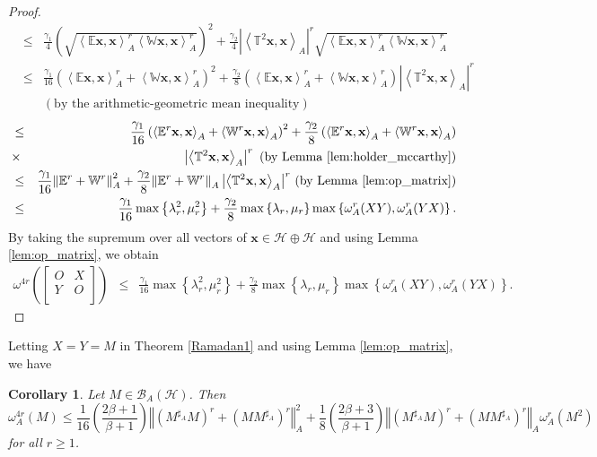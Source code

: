 \documentclass{article}
\newcommand{\bra}[1]{\left(#1\right)}
\newcommand{\seqA}[1]{{\left<#1\right>}_{A}}
\newcommand{\normA}[1]{{\left\Vert#1\right\Vert}_{A}}
\newcommand{\abs}[1]{\left\vert#1\right\vert}
\newcommand{\set}[1]{\left\{#1\right\}}
\newcommand{\hh}{\mathcal{H}\oplus\mathcal{H}}
\newcommand {\W}{\mathbb{W}}
\newcommand {\E}{\mathbb{E}}
\newcommand {\Ma}{M^{\sharp_{A}}}
\newcommand {\T}{\mathbb{T}}
\newcommand {\h}{\mathcal{H}}
\renewcommand {\b}{\mathcal{B}}
\newtheorem{corollary}[theorem]{Corollary}
\begin{document}
\begin{proof}
\begin{eqnarray*}
  &\leq& \frac{\gamma_1}{4}\bra{\sqrt{\seqA{\E\mathbf{x},\mathbf{x}}^{r}\seqA{\W\mathbf{x},\mathbf{x}}^{r}}}^2+
  \frac{\gamma_2}{4}\abs{\seqA{\T^2\mathbf{x},\mathbf{x}}}^r\sqrt{\seqA{\E\mathbf{x},\mathbf{x}}^{r}\seqA{\W\mathbf{x},\mathbf{x}}^{r}}\\
  &\leq& \frac{\gamma_1}{16}\bra{\seqA{\E\mathbf{x},\mathbf{x}}^{r}+\seqA{\W\mathbf{x},\mathbf{x}}^{r}}^2+
  \frac{\gamma_2}{8}\bra{\seqA{\E\mathbf{x},\mathbf{x}}^{r}+\seqA{\W\mathbf{x},\mathbf{x}}^{r}}\abs{\seqA{\T^2\mathbf{x},\mathbf{x}}}^r\\
  &&\bra{\mbox{by the arithmetic-geometric mean inequality}}
  \end{eqnarray*}
   \begin{eqnarray*}
  &\leq& \frac{\gamma_1}{16}\bra{\seqA{\E^r\mathbf{x},\mathbf{x}}
  +\seqA{\W^r\mathbf{x},\mathbf{x}}}^2+\frac{\gamma_2}{8}\bra{\seqA{\E^r\mathbf{x},\mathbf{x}}+
  \seqA{\W^r\mathbf{x},\mathbf{x}}}\\
  &\times&\abs{\seqA{\T^2\mathbf{x},\mathbf{x}}}^r\,\,\bra{\mbox{by Lemma \ref{lem:holder_mccarthy}}}\\
   &\leq& \frac{\gamma_1}{16}\normA{\E^r+\W^r}^2+\frac{\gamma_2}{8}\normA{\E^r+\W^r}\abs{\seqA{\T^2\mathbf{x},\mathbf{x}}}^{r}\,\bra{\mbox{by Lemma \ref{lem:op_matrix}}}\\
   &\leq&\frac{\gamma_1}{16}\max\set{\lambda_r^2,\mu_r^2}+\frac{\gamma_2}{8}\max\set{\lambda_r,\mu_r}\max\set{\omega_A^r(XY),\omega_A^r(YX)}.
   \end{eqnarray*}
By taking the supremum over all vectors of $\mathbf{x}\in\hh$ and using Lemma \ref{lem:op_matrix}, we obtain
\begin{eqnarray*}
  \omega^{4r}\bra{\begin{bmatrix} O& X\\ Y& O \\\end{bmatrix}}&\leq& \frac{\gamma_1}{16}\max\set{\lambda_r^2,\mu_r^2}+\frac{\gamma_2}{8}\max\set{\lambda_r,\mu_r}\max\set{\omega_A^r(XY),\omega_A^r(YX)}.
\end{eqnarray*}
\end{proof}
Letting $X=Y=M$ in  Theorem \ref{Ramadan1} and using Lemma \ref{lem:op_matrix}, we have
\begin{corollary} Let $M\in\b_A(\h)$. Then
$$\omega_{A}^{4r}(M)\leq \frac{1}{16}\bra{\frac{2\beta+1}{\beta+1}}\normA{\bra{\Ma M}^{r}+\bra{M\Ma}^{r}}^2
+\frac{1}{8}\bra{\frac{2\beta+3}{\beta+1}}\normA{\bra{\Ma M}^{r}+\bra{M\Ma}^{r}}\omega_A^{r}(M^2) $$
  for all $r\geq 1$.
\end{corollary}
\end{document}
